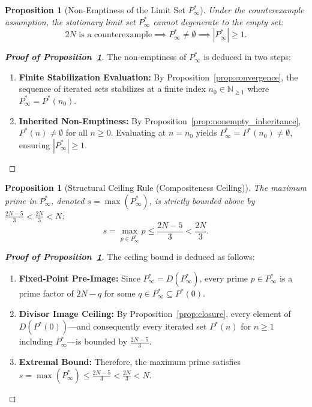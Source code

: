 \documentclass[11pt,a4paper]{article}
\newtheorem{proposition}[theorem]{Proposition}
\theoremstyle{definition}
\begin{document}
\begin{proposition}[Non-Emptiness of the Limit Set $P^*_\infty$]
\label{prop:limit_nonempty}
Under the counterexample assumption, the stationary limit set $P^*_\infty$ cannot degenerate to the empty set:
\[
2N \text{ is a counterexample} \implies P^*_\infty \neq \emptyset \implies |P^*_\infty| \ge 1.
\]
\end{proposition}
\begin{proof}[\textbf{Proof of Proposition~\ref{prop:limit_nonempty}}]
The non-emptiness of $P^*_\infty$ is deduced in two steps:
\begin{enumerate}
    \item \textbf{Finite Stabilization Evaluation:} By Proposition~\ref{prop:convergence}, the sequence of iterated sets stabilizes at a finite index $n_0 \in \mathbb{N}_{\ge 1}$ where $P^*_\infty = P^*(n_0)$.
    \item \textbf{Inherited Non-Emptiness:} By Proposition~\ref{prop:nonempty_inheritance}, $P^*(n) \neq \emptyset$ for all $n \ge 0$. Evaluating at $n = n_0$ yields $P^*_\infty = P^*(n_0) \neq \emptyset$, ensuring $|P^*_\infty| \ge 1$.
\end{enumerate}
\end{proof}

\begin{proposition}[Structural Ceiling Rule (Compositeness Ceiling)]
\label{prop:ceiling}
The maximum prime in $P^*_\infty$, denoted $s = \max(P^*_\infty)$, is strictly bounded above by $\frac{2N - 5}{3} < \frac{2N}{3} < N$:
\[
s = \max_{p \in P^*_\infty} p \le \frac{2N - 5}{3} < \frac{2N}{3}.
\]
\end{proposition}
\begin{proof}[\textbf{Proof of Proposition~\ref{prop:ceiling}}]
The ceiling bound is deduced as follows:
\begin{enumerate}
    \item \textbf{Fixed-Point Pre-Image:} Since $P^*_\infty = D(P^*_\infty)$, every prime $p \in P^*_\infty$ is a prime factor of $2N - q$ for some $q \in P^*_\infty \subseteq P^*(0)$.
    \item \textbf{Divisor Image Ceiling:} By Proposition~\ref{prop:closure}, every element of $D(P^*(0))$---and consequently every iterated set $P^*(n)$ for $n \ge 1$ including $P^*_\infty$---is bounded by $\frac{2N - 5}{3}$.
    \item \textbf{Extremal Bound:} Therefore, the maximum prime satisfies $s = \max(P^*_\infty) \le \frac{2N - 5}{3} < \frac{2N}{3} < N$.
\end{enumerate}
\end{proof}
\end{document}
